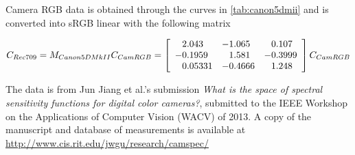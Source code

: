 Camera \gls{RGB} data is obtained through the curves in
\cref{tab:canon5dmii} and is converted into
\gls{sRGB} linear with the following matrix

\begin{displaymath}
C_{Rec709} = M_{Canon5DMkII} C_{CamRGB} = \left[\begin{array}{r@{.}lr@{.}lr@{.}l}
 2&043   & -1&065  &  0&107  \\
-0&1959  &  1&581  & -0&3999 \\
 0&05331 & -0&4666 &  1&248  \\
\end{array}\right] C_{CamRGB}
\end{displaymath}

The data is from Jun Jiang et al.'s submission \textit{What is the space of spectral sensitivity
functions for digital color cameras?}, submitted to the IEEE Workshop on the Applications of Computer
Vision (WACV) of 2013.
A copy of the manuscript and database of measurements is available at 
\url{http://www.cis.rit.edu/jwgu/research/camspec/}

